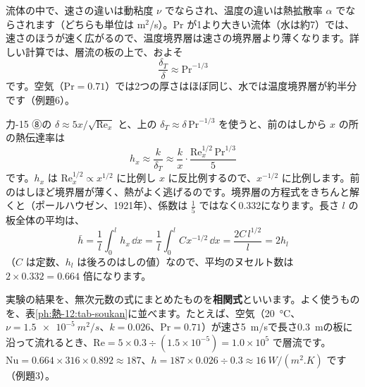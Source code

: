 流体の中で、速さの違いは動粘度 $\nu$ でならされ、温度の違いは熱拡散率 $\alpha$ でならされます（どちらも単位は m$^2$/s）。Pr が1より大きい流体（水は約7）では、速さのほうが速く広がるので、温度境界層は速さの境界層より薄くなります。詳しい計算では、層流の板の上で、およそ
\[\frac{\delta_T}{\delta}\approx\mathrm{Pr}^{-1/3}\]
です。空気（$\mathrm{Pr}=0.71$）では2つの厚さはほぼ同じ、水では温度境界層が約半分です（例題6）。

力-15 ⑧の $\delta\approx5x/\sqrt{\mathrm{Re}_x}$ と、上の $\delta_T\approx\delta\,\mathrm{Pr}^{-1/3}$ を使うと、前のはしから $x$ の所の熱伝達率は
\[h_x\approx\frac{k}{\delta_T}\approx\frac{k}{x}\cdot\frac{\mathrm{Re}_x^{1/2}\,\mathrm{Pr}^{1/3}}{5}\]
です。$h_x$ は $\mathrm{Re}_x^{1/2}\propto x^{1/2}$ に比例し $x$ に反比例するので、$x^{-1/2}$ に比例します。前のはしほど境界層が薄く、熱がよく逃げるのです。境界層の方程式をきちんと解くと（ポールハウゼン、1921年）、係数は $\tfrac15$ ではなく0.332になります。長さ $l$ の板全体の平均は、
\[\bar h=\frac{1}{l}\int_0^l h_x\,\dd x=\frac{1}{l}\int_0^l Cx^{-1/2}\,\dd x=\frac{2C\,l^{1/2}}{l}=2h_l\]
（$C$ は定数、$h_l$ は後ろのはしの値）なので、平均のヌセルト数は $2\times0.332=0.664$ 倍になります。

\begin{phflow}[層流の板の熱伝達]
\end{phflow}

\label{ph:熱-12:sec6}
実験の結果を、無次元数の式にまとめたものを\textbf{相関式}といいます。よく使うものを、表\ref{ph:熱-12:tab-soukan}に並べます。たとえば、空気（\qty{20}{\celsius}、$\nu=\qty{1.5e-5}{m^2/s}$、$k=0.026$、$\mathrm{Pr}=0.71$）が速さ\qty{5}{m/s}で長さ\qty{0.3}{m}の板に沿って流れるとき、$\mathrm{Re}=5\times0.3\div(1.5\times10^{-5})=1.0\times10^5$ で層流です。$\mathrm{Nu}=0.664\times316\times0.892\approx187$、$h=187\times0.026\div0.3\approx\qty{16}{W/(m^2.K)}$ です（例題3）。

